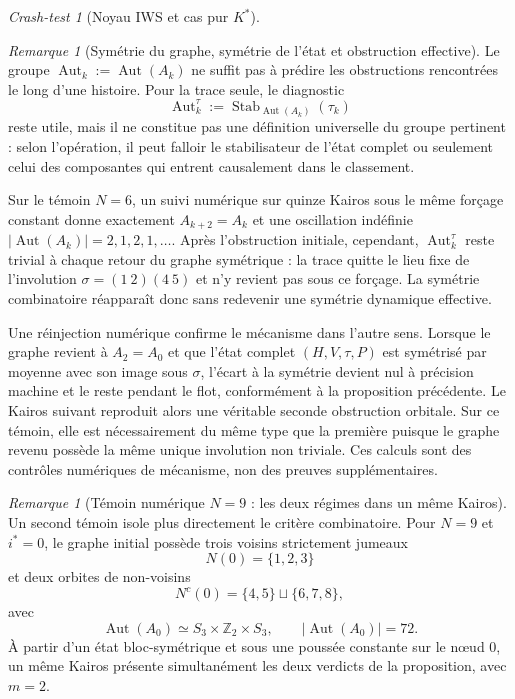 \documentclass[11pt,a4paper]{article}
\theoremstyle{definition}
\theoremstyle{remark}
\newtheorem{remark}[definition]{Remarque}
\newtheorem{crashtest}[definition]{Crash-test}
\begin{document}
\begin{crashtest}[Noyau IWS et cas pur $K^*$]
\begin{remark}[Symétrie du graphe, symétrie de l'état et obstruction effective]
Le groupe $\operatorname{Aut}_k:=\operatorname{Aut}(A_k)$ ne suffit pas à prédire les obstructions rencontrées le long d'une histoire. Pour la trace seule, le diagnostic
\[
\operatorname{Aut}_k^\tau:=\operatorname{Stab}_{\operatorname{Aut}(A_k)}(\tau_k)
\]
reste utile, mais il ne constitue pas une définition universelle du groupe pertinent : selon l'opération, il peut falloir le stabilisateur de l'état complet ou seulement celui des composantes qui entrent causalement dans le classement.

Sur le témoin $N=6$, un suivi numérique sur quinze Kairos sous le même forçage constant donne exactement $A_{k+2}=A_k$ et une oscillation indéfinie $|\operatorname{Aut}(A_k)|=2,1,2,1,\ldots$. Après l'obstruction initiale, cependant, $\operatorname{Aut}_k^\tau$ reste trivial à chaque retour du graphe symétrique : la trace quitte le lieu fixe de l'involution $\sigma=(1\ 2)(4\ 5)$ et n'y revient pas sous ce forçage. La symétrie combinatoire réapparaît donc sans redevenir une symétrie dynamique effective.

Une réinjection numérique confirme le mécanisme dans l'autre sens. Lorsque le graphe revient à $A_2=A_0$ et que l'état complet $(H,V,\tau,P)$ est symétrisé par moyenne avec son image sous $\sigma$, l'écart à la symétrie devient nul à précision machine et le reste pendant le flot, conformément à la proposition précédente. Le Kairos suivant reproduit alors une véritable seconde obstruction orbitale. Sur ce témoin, elle est nécessairement du même type que la première puisque le graphe revenu possède la même unique involution non triviale. Ces calculs sont des contrôles numériques de mécanisme, non des preuves supplémentaires.
\end{remark}

\begin{remark}[Témoin numérique $N=9$ : les deux régimes dans un même Kairos]
Un second témoin isole plus directement le critère combinatoire. Pour $N=9$ et $i^*=0$, le graphe initial possède trois voisins strictement jumeaux
\[
N(0)=\{1,2,3\}
\]
et deux orbites de non-voisins
\[
N^c(0)=\{4,5\}\sqcup\{6,7,8\},
\]
avec
\[
\operatorname{Aut}(A_0)\simeq S_3\times\mathbb Z_2\times S_3,
\qquad |\operatorname{Aut}(A_0)|=72.
\]
À partir d'un état bloc-symétrique et sous une poussée constante sur le nœud $0$, un même Kairos présente simultanément les deux verdicts de la proposition, avec $m=2$.


\end{remark}
\end{crashtest}
\end{document}
